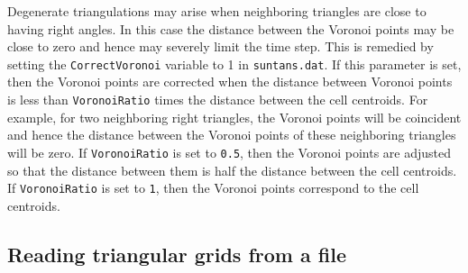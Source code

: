 Degenerate triangulations may arise when neighboring triangles are close to having
right angles.  In this case the distance between the Voronoi points may be close
to zero and hence may severely limit the time step.  This is remedied by setting
the \verb+CorrectVoronoi+ variable to 1 in \verb+suntans.dat+.  If this
parameter is set, then the Voronoi points are corrected when the distance
between Voronoi points is less than \verb+VoronoiRatio+ times the distance between
the cell centroids.  For example, for two neighboring right triangles, the Voronoi
points will be coincident and hence the distance between the Voronoi points of these
neighboring triangles will be zero.  If \verb+VoronoiRatio+ is set to \verb+0.5+, 
then the Voronoi points are adjusted so that the distance between them is half the
distance between the cell centroids.  If \verb+VoronoiRatio+ is set to \verb+1+,
then the Voronoi points correspond to the cell centroids.

\subsection{Reading triangular grids from a file} \label{sec:readgrid}

